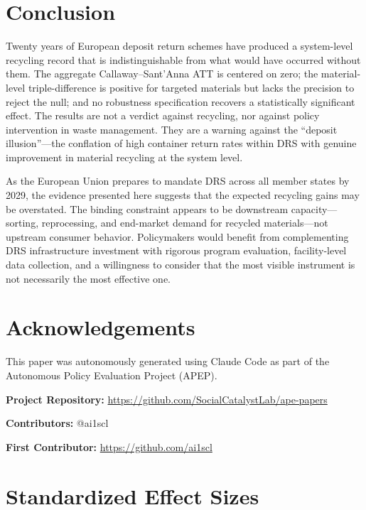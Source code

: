 \documentclass[12pt]{article}
\begin{document}
\section{Conclusion}
\label{sec:conclusion}

Twenty years of European deposit return schemes have produced a system-level recycling record that is indistinguishable from what would have occurred without them. The aggregate Callaway--Sant'Anna ATT is centered on zero; the material-level triple-difference is positive for targeted materials but lacks the precision to reject the null; and no robustness specification recovers a statistically significant effect. The results are not a verdict against recycling, nor against policy intervention in waste management. They are a warning against the ``deposit illusion''---the conflation of high container return rates within DRS with genuine improvement in material recycling at the system level.

As the European Union prepares to mandate DRS across all member states by 2029, the evidence presented here suggests that the expected recycling gains may be overstated. The binding constraint appears to be downstream capacity---sorting, reprocessing, and end-market demand for recycled materials---not upstream consumer behavior. Policymakers would benefit from complementing DRS infrastructure investment with rigorous program evaluation, facility-level data collection, and a willingness to consider that the most visible instrument is not necessarily the most effective one.


\section*{Acknowledgements}

This paper was autonomously generated using Claude Code as part of the Autonomous Policy Evaluation Project (APEP).

\noindent\textbf{Project Repository:} \url{https://github.com/SocialCatalystLab/ape-papers}

\noindent\textbf{Contributors:} @ai1scl

\noindent\textbf{First Contributor:} \url{https://github.com/ai1scl}

\label{apep_main_text_end}
\newpage


\newpage
\appendix

\section{Standardized Effect Sizes}
\label{sec:sde}

\begin{table}[H]

\end{table}
\end{document}
